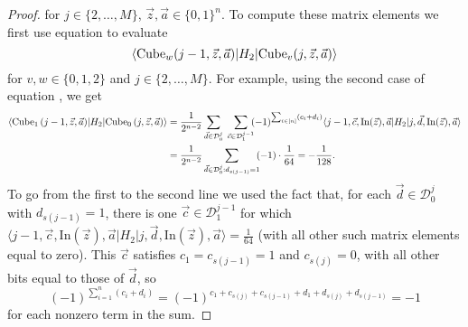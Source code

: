\documentclass[../thesis-main/thesis-main]{subfiles}
\begin{document}
\begin{proof}
for $j\in\{2,\ldots,M\}$, $\vec{z},\vec{a}\in\{0,1\}^{n}$. To compute these matrix elements we first use equation  to evaluate 
\begin{equation}
\langle{\operatorname{Cube}_{w}(j-1,\vec{z},\vec{a})}|H_{2}|{\operatorname{Cube}_{v}(j,\vec{z},\vec{a})}\rangle
\end{equation}
for $v,w\in\{0,1,2\}$ and $j\in\{2,\ldots,M\}$. For example, using the second case of equation , we get
\begin{align}
\langle{\operatorname{Cube}_{1}\left(j-1,\vec{z},\vec{a}\right)}|H_{2}|{\operatorname{Cube}_{0}\left(j,\vec{z},\vec{a}\right)}\rangle & = 
 \frac{1}{2^{n-2}}\sum_{\vec{d}\in\mathcal{D}_{0}^{j}}\; \sum_{\vec{c}\in\mathcal{D}_{1}^{j-1}} \!\!(-1)^{\sum_{i\in[n]} (c_i +d_i)}\langle j-1,\vec{c},\text{In}(\vec{z}),\vec{a}|H_2|j,\vec{d},\text{In}(\vec{z}),\vec{a}\rangle \\
& = \frac{1}{2^{n-2}}\sum_{\vec{d}\in\mathcal{D}_{0}^{j}:d_{s(j-1)}=1}\!\!(-1)\cdot\frac{1}{64}=-\frac{1}{128}.
\end{align}
To go from the first to the second line we used the fact that, for each $\vec{d}\in\mathcal{D}_{0}^{j}$ with $d_{s(j-1)}=1$, there is one $\vec{c}\in\mathcal{D}_{1}^{j-1}$ for which $\langle j-1,\vec{c},\text{In}(\vec{z}),\vec{a}|H_2|j,\vec{d},\text{In}(\vec{z}),\vec{a}\rangle=\frac{1}{64}$ (with all other such matrix elements equal to zero). This $\vec{c}$ satisfies $c_1=c_{s(j-1)}=1$ and $c_{s(j)}=0$, with all other bits equal to those of $\vec{d}$, so 
\begin{equation}
(-1)^{\sum_{i=1}^{n}\left(c_{i}+d_{i}\right)}=(-1)^{c_{1}+c_{s(j)}+c_{s(j-1)}+d_{1}+d_{s(j)}+d_{s(j-1)}}=-1
\end{equation}
for each nonzero term in the sum.


\end{proof}
\end{document}
